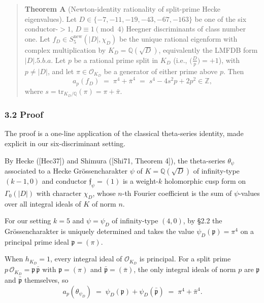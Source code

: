 \documentclass[
  11pt,
  a4paper,
]{amsart}
\begin{document}
\begin{quote}
\textbf{Theorem A} (Newton-identity rationality of split-prime Hecke eigenvalues).
Let \(D \in \{-7, -11, -19, -43, -67, -163\}\) be one of the six conductor-\(> 1\), \(D \equiv 1 \pmod 4\) Heegner discriminants of class number one. Let \(f_D \in S_5^{\mathrm{new}}(|D|, \chi_D)\) be the unique rational eigenform with complex multiplication by \(K_D = \mathbb{Q}(\sqrt D)\), equivalently the LMFDB form \(|D|.5.b.a\). Let \(p\) be a rational prime split in \(K_D\) (i.e., \(\bigl(\tfrac{D}{p}\bigr) = +1\)), with \(p \neq |D|\), and let \(\pi \in \mathcal{O}_{K_D}\) be a generator of either prime above \(p\). Then
\[
a_p(f_D) \;=\; \pi^{4} + \bar\pi^{4} \;=\; s^{4} - 4 s^{2} p + 2 p^{2} \in \mathbb{Z},
\]
where \(s = \mathrm{tr}_{K_D/\mathbb{Q}}(\pi) = \pi + \bar\pi\).
\end{quote}

\hypertarget{proof}{%
\subsubsection{3.2 Proof}\label{proof}}

The proof is a one-line application of the classical theta-series identity, made explicit in our six-discriminant setting.

By Hecke ({[}Hec37{]}) and Shimura ({[}Shi71, Theorem 4{]}), the theta-series \(\theta_\psi\) associated to a Hecke Grössencharakter \(\psi\) of \(K = \mathbb{Q}(\sqrt D)\) of infinity-type \((k - 1, 0)\) and conductor \(\mathfrak{f}_\psi = (1)\) is a weight-\(k\) holomorphic cusp form on \(\Gamma_0(|D|)\) with character \(\chi_D\), whose \(n\)-th Fourier coefficient is the sum of \(\psi\)-values over all integral ideals of \(K\) of norm \(n\).

For our setting \(k = 5\) and \(\psi = \psi_D\) of infinity-type \((4, 0)\), by §2.2 the Grössencharakter is uniquely determined and takes the value \(\psi_D(\mathfrak{p}) = \pi^4\) on a principal prime ideal \(\mathfrak{p} = (\pi)\).

When \(h_{K_D} = 1\), every integral ideal of \(\mathcal{O}_{K_D}\) is principal. For a split prime \(p\,\mathcal{O}_{K_D} = \mathfrak{p}\,\bar{\mathfrak{p}}\) with \(\mathfrak{p} = (\pi)\) and \(\bar{\mathfrak{p}} = (\bar\pi)\), the only integral ideals of norm \(p\) are \(\mathfrak{p}\) and \(\bar{\mathfrak{p}}\) themselves, so
\[
a_p(\theta_{\psi_D}) \;=\; \psi_D(\mathfrak{p}) + \psi_D(\bar{\mathfrak{p}}) \;=\; \pi^4 + \bar\pi^4.
\]
\end{document}
